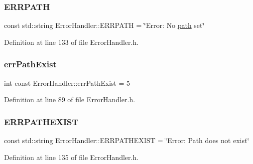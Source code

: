 \subsubsection{\texorpdfstring{ERRPATH}{ERRPATH}}
{\footnotesize\ttfamily const std\+::string Error\+Handler\+::\+E\+R\+R\+P\+A\+TH = \char`\"{}Error\+: No \mbox{\hyperlink{classErrorHandler_aeabbc987b7eaa01b6d006b55b4e00574}{path}} set\char`\"{}\hspace{0.3cm}{\ttfamily [static]}}



Definition at line 133 of file Error\+Handler.\+h.

\mbox{\label{classErrorHandler_aced178ea322067ec756e3d1714efc6e4}} 
\subsubsection{\texorpdfstring{errPathExist}{errPathExist}}
{\footnotesize\ttfamily int const Error\+Handler\+::err\+Path\+Exist = 5\hspace{0.3cm}{\ttfamily [static]}}



Definition at line 89 of file Error\+Handler.\+h.

\mbox{\label{classErrorHandler_a18de05a2e4538d1417f22b02bbb763bf}} 
\subsubsection{\texorpdfstring{ERRPATHEXIST}{ERRPATHEXIST}}
{\footnotesize\ttfamily const std\+::string Error\+Handler\+::\+E\+R\+R\+P\+A\+T\+H\+E\+X\+I\+ST = \char`\"{}Error\+: Path does not exist\char`\"{}\hspace{0.3cm}{\ttfamily [static]}}



Definition at line 135 of file Error\+Handler.\+h.

\mbox{\label{classErrorHandler_aa25a9f5aef3ad844325d5fb3e0fa444d}} 
